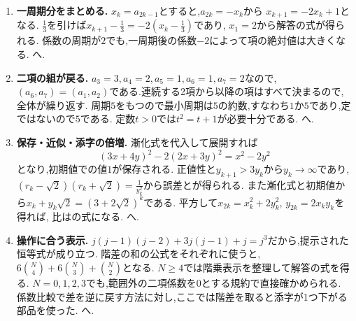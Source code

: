 \begin{enumerate}[label=\textbf{問\arabic*.},format=\bookitemlink{practice-connections}{solution}{problem}]
  \item \textbf{一周期分をまとめる.}
    $x_k=a_{2k-1}$とすると,$a_{2k}=-x_k$から
    $x_{k+1}=-2x_k+1$となる.
    $\frac{1}{3}$を引けば$x_{k+1}-\frac{1}{3}=-2\left(x_k-\frac{1}{3}\right)$であり,
    $x_1=2$から解答の式が得られる.
    係数の周期が$2$でも,一周期後の係数$-2$によって項の絶対値は大きくなる.
    へ.
  \item \textbf{二項の組が戻る.}
    $a_3=3,a_4=2,a_5=1,a_6=1,a_7=2$なので,
    $(a_6,a_7)=(a_1,a_2)$である.連続する2項から以降の項はすべて決まるので,全体が繰り返す.
    周期$5$をもつので最小周期は$5$の約数,すなわち$1$か$5$であり,定ではないので$5$である.
    定数$t>0$では$t^2=t+1$が必要十分である.
    へ.
  \item \textbf{保存・近似・添字の倍増.}
    漸化式を代入して展開すれば
    \[
      (3x+4y)^2-2(2x+3y)^2=x^2-2y^2
    \]
    となり,初期値での値$1$が保存される.
    正値性と$y_{k+1}>3y_k$から$y_k\to\infty$であり,
    $(r_k-\sqrt2)(r_k+\sqrt2)=\frac{1}{y_k^2}$から誤差とが得られる.
    また漸化式と初期値から$x_k+y_k\sqrt2=(3+2\sqrt2)^k$である.
    平方して$x_{2k}=x_k^2+2y_k^2$, $y_{2k}=2x_ky_k$を得れば,
    比はの式になる.
    へ.
  \item \textbf{操作に合う表示.}
    $j(j-1)(j-2)+3j(j-1)+j=j^3$だから,提示された恒等式が成り立つ.
    階差の和の公式をそれぞれに使うと,
    $6\binom N4+6\binom N3+\binom N2$となる.
    $N\ge4$では階乗表示を整理して解答の式を得る.
    $N=0,1,2,3$でも,範囲外の二項係数を0とする規約で直接確かめられる.
    係数比較で差を逆に戻す方法に対し,ここでは階差を取ると添字が1つ下がる部品を使った.
    へ.
\end{enumerate}
